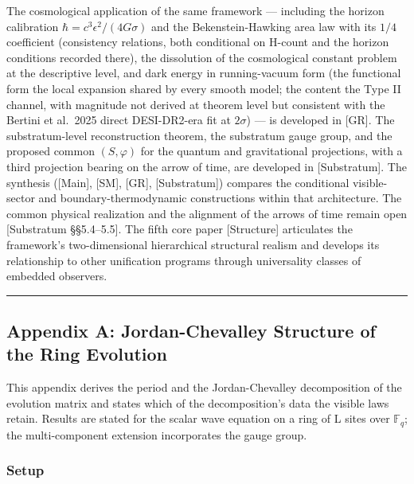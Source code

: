 \documentclass[
]{article}
\begin{document}
The cosmological application of the same framework --- including the
horizon calibration \(\hbar = c^3\epsilon^2/(4G\sigma)\) and the
Bekenstein-Hawking area law with its \(1/4\) coefficient (consistency
relations, both conditional on H-count and the horizon conditions
recorded there), the dissolution of the cosmological constant problem at
the descriptive level, and dark energy in running-vacuum form (the
functional form the local expansion shared by every smooth model; the
content the Type II channel, with magnitude not derived at theorem level
but consistent with the Bertini et al.~2025 direct DESI-DR2-era fit at
\(2\sigma\)) --- is developed in {[}GR{]}. The substratum-level
reconstruction theorem, the substratum gauge group, and the proposed
common \((S,\varphi)\) for the quantum and gravitational projections,
with a third projection bearing on the arrow of time, are developed in
{[}Substratum{]}. The synthesis ({[}Main{]}, {[}SM{]}, {[}GR{]},
{[}Substratum{]}) compares the conditional visible-sector and
boundary-thermodynamic constructions within that architecture. The
common physical realization and the alignment of the arrows of time
remain open {[}Substratum §§5.4--5.5{]}. The fifth core paper
{[}Structure{]} articulates the framework's two-dimensional hierarchical
structural realism and develops its relationship to other unification
programs through universality classes of embedded observers.

\begin{center}\rule{0.5\linewidth}{0.5pt}\end{center}

\hypertarget{appendix-a-jordan-chevalley-structure-of-the-ring-evolution}{%
\subsection{Appendix A: Jordan-Chevalley Structure of the Ring
Evolution}\label{appendix-a-jordan-chevalley-structure-of-the-ring-evolution}}

This appendix derives the period and the Jordan-Chevalley decomposition
of the evolution matrix and states which of the decomposition's data the
visible laws retain. Results are stated for the scalar wave equation on
a ring of L sites over \(\mathbb{F}_q\); the multi-component extension
incorporates the gauge group.

\hypertarget{setup}{%
\subsubsection{Setup}\label{setup}}
\end{document}
